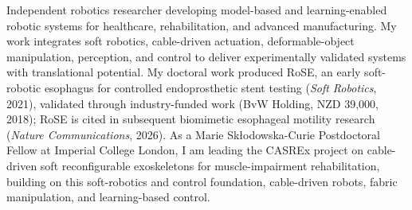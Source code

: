 Independent robotics researcher developing model-based and learning-enabled robotic systems for healthcare, rehabilitation, and advanced manufacturing. My work integrates soft robotics, cable-driven actuation, deformable-object manipulation, perception, and control to deliver experimentally validated systems with translational potential. My doctoral work produced RoSE, an early soft-robotic esophagus for controlled endoprosthetic stent testing (\textit{Soft Robotics}, 2021), validated through industry-funded work (BvW Holding, NZD 39,000, 2018); RoSE is cited in subsequent biomimetic esophageal motility research (\textit{Nature Communications}, 2026). As a Marie Skłodowska-Curie Postdoctoral Fellow at Imperial College London, I am leading the CASREx project on cable-driven soft reconfigurable exoskeletons for muscle-impairment rehabilitation, building on this soft-robotics and control foundation, cable-driven robots, fabric manipulation, and learning-based control.


